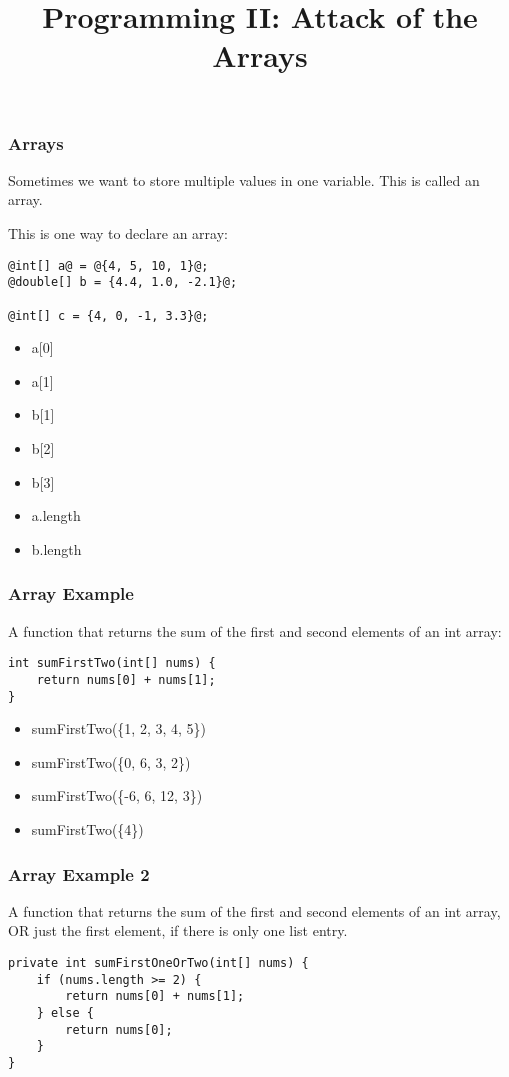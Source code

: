 \documentclass{beamer}
\title{Programming II: Attack of the Arrays}
\date{}
\begin{document}
\frame{\titlepage}

\begin{frame}[fragile]
\frametitle{Arrays}
Sometimes we want to store multiple values in one variable. This is called an array.
\pause
\medskip

This is one way to declare an array:
\begin{lstlisting}[style=base]
@int[] a@ = @{4, 5, 10, 1}@;
@double[] b = {4.4, 1.0, -2.1}@;

@int[] c = {4, 0, -1, 3.3}@;
\end{lstlisting}

\begin{itemize}
\item<6->a[0]
\item<7->a[1]
\item<8->b[1]
\item<9->b[2]
\item<10->b[3]
\item<11->a.length
\item<12->b.length
\end{itemize}
\end{frame}

\begin{frame}[fragile]
\frametitle{Array Example}
A function that returns the sum of the first and second elements of an int array:

\begin{lstlisting}[style=basenopause]
int sumFirstTwo(int[] nums) {
    return nums[0] + nums[1];
}
\end{lstlisting}
\begin{itemize}
\item<2->sumFirstTwo(\{1, 2, 3, 4, 5\})
\item<3->sumFirstTwo(\{0, 6, 3, 2\})
\item<4->sumFirstTwo(\{-6, 6, 12, 3\})
\item<5->sumFirstTwo(\{4\})
\end{itemize}
\end{frame}

\begin{frame}[fragile]
\frametitle{Array Example 2}
A function that returns the sum of the first and second elements of an int array, OR just the first element, if there is only one list entry.

\begin{lstlisting}[style=basenopause]
private int sumFirstOneOrTwo(int[] nums) {
    if (nums.length >= 2) {
        return nums[0] + nums[1];
    } else {
        return nums[0];
    }
}
\end{lstlisting}
\end{frame}
\end{document}

